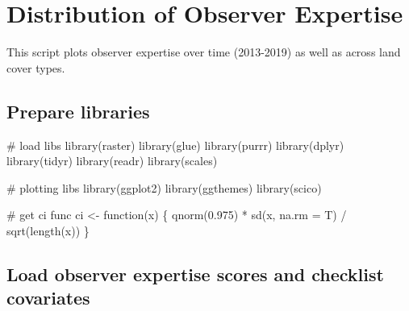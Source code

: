 \documentclass[]{article}
\newenvironment{Shaded}{}{}
\newcommand{\CommentTok}[1]{\textcolor[rgb]{0.00,0.50,0.00}{#1}}
\newcommand{\ControlFlowTok}[1]{\textcolor[rgb]{0.00,0.00,1.00}{#1}}
\newcommand{\DataTypeTok}[1]{#1}
\newcommand{\FloatTok}[1]{#1}
\newcommand{\KeywordTok}[1]{\textcolor[rgb]{0.00,0.00,1.00}{#1}}
\newcommand{\NormalTok}[1]{#1}
\newcommand{\OperatorTok}[1]{#1}
\newcommand{\StringTok}[1]{\textcolor[rgb]{0.00,0.50,0.50}{#1}}
\begin{document}
\hypertarget{distribution-of-observer-expertise}{%
\section{Distribution of Observer Expertise}\label{distribution-of-observer-expertise}}

This script plots observer expertise over time (2013-2019) as well as across land cover types.

\hypertarget{prepare-libraries-2}{%
\subsection{Prepare libraries}\label{prepare-libraries-2}}

\begin{Shaded}
\begin{Highlighting}[numbers=left,,]
\CommentTok{# load libs}
\KeywordTok{library}\NormalTok{(raster)}
\KeywordTok{library}\NormalTok{(glue)}
\KeywordTok{library}\NormalTok{(purrr)}
\KeywordTok{library}\NormalTok{(dplyr)}
\KeywordTok{library}\NormalTok{(tidyr)}
\KeywordTok{library}\NormalTok{(readr)}
\KeywordTok{library}\NormalTok{(scales)}

\CommentTok{# plotting libs}
\KeywordTok{library}\NormalTok{(ggplot2)}
\KeywordTok{library}\NormalTok{(ggthemes)}
\KeywordTok{library}\NormalTok{(scico)}

\CommentTok{# get ci func}
\NormalTok{ci <-}\StringTok{ }\ControlFlowTok{function}\NormalTok{(x) \{}
  \KeywordTok{qnorm}\NormalTok{(}\FloatTok{0.975}\NormalTok{) }\OperatorTok{*}\StringTok{ }\KeywordTok{sd}\NormalTok{(x, }\DataTypeTok{na.rm =}\NormalTok{ T) }\OperatorTok{/}\StringTok{ }\KeywordTok{sqrt}\NormalTok{(}\KeywordTok{length}\NormalTok{(x))}
\NormalTok{\}}
\end{Highlighting}
\end{Shaded}

\hypertarget{load-observer-expertise-scores-and-checklist-covariates}{%
\subsection{Load observer expertise scores and checklist covariates}\label{load-observer-expertise-scores-and-checklist-covariates}}
\end{document}
